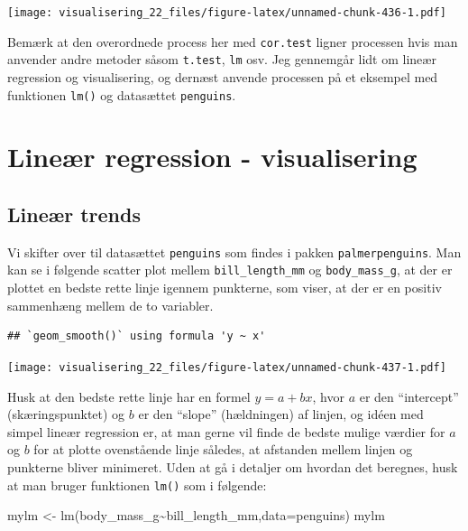 \documentclass[
]{book}
\newenvironment{Shaded}{\begin{snugshade}}{\end{snugshade}}
\newcommand{\AttributeTok}[1]{\textcolor[rgb]{0.77,0.63,0.00}{#1}}
\newcommand{\FunctionTok}[1]{\textcolor[rgb]{0.00,0.00,0.00}{#1}}
\newcommand{\NormalTok}[1]{#1}
\newcommand{\OtherTok}[1]{\textcolor[rgb]{0.56,0.35,0.01}{#1}}
\newcommand{\SpecialCharTok}[1]{\textcolor[rgb]{0.00,0.00,0.00}{#1}}
\begin{document}
\texttt{[image: visualisering\_22\_files/figure-latex/unnamed-chunk-436-1.pdf]}

Bemærk at den overordnede process her med \texttt{cor.test} ligner processen hvis man anvender andre metoder såsom \texttt{t.test}, \texttt{lm} osv. Jeg gennemgår lidt om lineær regression og visualisering, og dernæst anvende processen på et eksempel med funktionen \texttt{lm()} og datasættet \texttt{penguins}.

\hypertarget{lineuxe6r-regression---visualisering}{%
\section{Lineær regression - visualisering}\label{lineuxe6r-regression---visualisering}}

\hypertarget{lineuxe6r-trends}{%
\subsection{Lineær trends}\label{lineuxe6r-trends}}

Vi skifter over til datasættet \texttt{penguins} som findes i pakken \texttt{palmerpenguins}. Man kan se i følgende scatter plot mellem \texttt{bill\_length\_mm} og \texttt{body\_mass\_g}, at der er plottet en bedste rette linje igennem punkterne, som viser, at der er en positiv sammenhæng mellem de to variabler.

\begin{verbatim}
## `geom_smooth()` using formula 'y ~ x'
\end{verbatim}

\texttt{[image: visualisering\_22\_files/figure-latex/unnamed-chunk-437-1.pdf]}

Husk at den bedste rette linje har en formel \(y = a + bx\), hvor \(a\) er den ``intercept'' (skæringspunktet) og \(b\) er den ``slope'' (hældningen) af linjen, og idéen med simpel lineær regression er, at man gerne vil finde de bedste mulige værdier for \(a\) og \(b\) for at plotte ovenstående linje således, at afstanden mellem linjen og punkterne bliver minimeret. Uden at gå i detaljer om hvordan det beregnes, husk at man bruger funktionen \texttt{lm()} som i følgende:

\begin{Shaded}
\begin{Highlighting}[]
\NormalTok{mylm }\OtherTok{\textless{}{-}} \FunctionTok{lm}\NormalTok{(body\_mass\_g}\SpecialCharTok{\textasciitilde{}}\NormalTok{bill\_length\_mm,}\AttributeTok{data=}\NormalTok{penguins)}
\NormalTok{mylm}
\end{Highlighting}
\end{Shaded}
\end{document}
